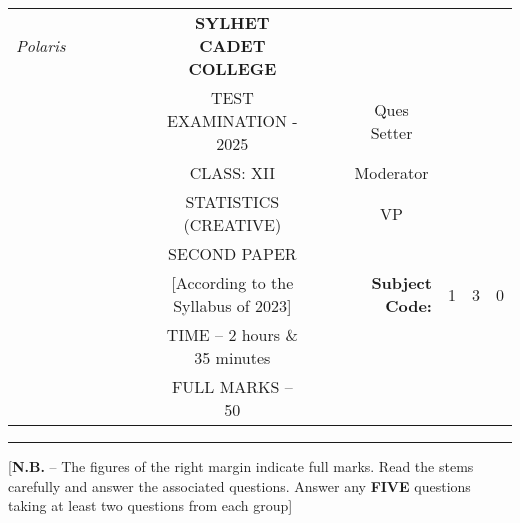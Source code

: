 \documentclass[12pt]{article}
\begin{document}
\begin{table}[]
\begin{tabular}{llllllcllrlll}
\textit{Polaris} &  &  &  &  &  & \textbf{SYLHET CADET COLLEGE}       &  &                       & \multicolumn{1}{l}{}                        &                        &                        &                        \\ \cline{10-13} 
                 &  &  &  &  &  & TEST EXAMINATION - 2025             &  & \multicolumn{1}{l|}{} & \multicolumn{1}{c|}{Ques Setter}            & \multicolumn{3}{l|}{}                                                    \\ \cline{10-13} 
                 &  &  &  &  &  & CLASS: XII                          &  & \multicolumn{1}{l|}{} & \multicolumn{1}{c|}{Moderator}              & \multicolumn{3}{l|}{}                                                    \\ \cline{10-13} 
                 &  &  &  &  &  & STATISTICS (CREATIVE)               &  & \multicolumn{1}{l|}{} & \multicolumn{1}{c|}{VP}                     & \multicolumn{3}{l|}{}                                                    \\ \cline{10-13} 
                 &  &  &  &  &  & SECOND PAPER                        &  &                       &                                             &                        &                        &                        \\ \cline{11-13} 
                 &  &  &  &  &  & [According to the Syllabus of 2023] &  &                       & \multicolumn{1}{r|}{\textbf{Subject Code:}} & \multicolumn{1}{l|}{1} & \multicolumn{1}{l|}{3} & \multicolumn{1}{l|}{0} \\ \cline{11-13} 
                 &  &  &  &  &  & TIME – 2 hours \& 35 minutes        &  &                       &                                             &                        &                        &                        \\
                 &  &  &  &  &  & FULL MARKS – 50                     &  &                       & \textbf{}                                   &                        &                        &                       
\end{tabular}
\end{table}

\hrule

\begin{center}
[\textbf{N.B.} – The figures of the right margin indicate full marks. Read the stems carefully and answer the associated questions. Answer any \textbf{FIVE} questions taking at least two questions from each group]\\
\end{center}
\end{document}
